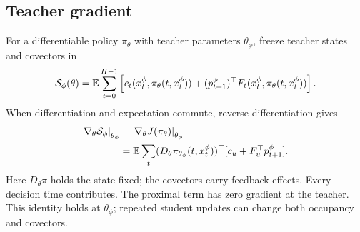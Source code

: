\subsection{Teacher gradient}
For a differentiable policy $\pi_\theta$ with teacher parameters
$\theta_\phi$, freeze teacher states and covectors in
\begin{equation}
 \mathcal S_\phi(\theta)=\mathbb E\sum_{t=0}^{H-1}
 \left[c_t(x_t^\phi,\pi_\theta(t,x_t^\phi))
 +(p_{t+1}^\phi)^\top F_t(x_t^\phi,\pi_\theta(t,x_t^\phi))\right].
\end{equation}
When differentiation and expectation commute, reverse differentiation gives
\begin{align}
 \left.\nabla_\theta\mathcal S_\phi\right|_{\theta_\phi}
 &=\left.\nabla_\theta J(\pi_\theta)\right|_{\theta_\phi}\\
 &=\mathbb E\sum_t(D_\theta\pi_{\theta_\phi}(t,x_t^\phi))^\top
                  [c_u+F_u^\top p_{t+1}^\phi].
\end{align}
Here $D_\theta\pi$ holds the state fixed; the covectors carry feedback
effects. Every decision time contributes. The proximal term has zero
gradient at the teacher. This identity holds at $\theta_\phi$; repeated
student updates can change both occupancy and covectors.
